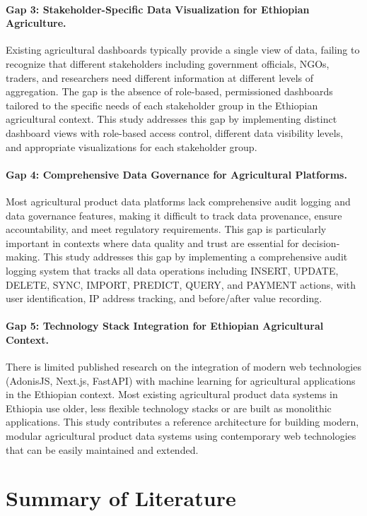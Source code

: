\paragraph{Gap 3: Stakeholder-Specific Data Visualization for Ethiopian Agriculture.}
Existing agricultural dashboards typically provide a single view of data, failing to recognize that different stakeholders including government officials, NGOs, traders, and researchers need different information at different levels of aggregation. The gap is the absence of role-based, permissioned dashboards tailored to the specific needs of each stakeholder group in the Ethiopian agricultural context. This study addresses this gap by implementing distinct dashboard views with role-based access control, different data visibility levels, and appropriate visualizations for each stakeholder group.

\paragraph{Gap 4: Comprehensive Data Governance for Agricultural Platforms.}
Most agricultural product data platforms lack comprehensive audit logging and data governance features, making it difficult to track data provenance, ensure accountability, and meet regulatory requirements. This gap is particularly important in contexts where data quality and trust are essential for decision-making. This study addresses this gap by implementing a comprehensive audit logging system that tracks all data operations including INSERT, UPDATE, DELETE, SYNC, IMPORT, PREDICT, QUERY, and PAYMENT actions, with user identification, IP address tracking, and before/after value recording.

\paragraph{Gap 5: Technology Stack Integration for Ethiopian Agricultural Context.}
There is limited published research on the integration of modern web technologies (AdonisJS, Next.js, FastAPI) with machine learning for agricultural applications in the Ethiopian context. Most existing agricultural product data systems in Ethiopia use older, less flexible technology stacks or are built as monolithic applications. This study contributes a reference architecture for building modern, modular agricultural product data systems using contemporary web technologies that can be easily maintained and extended.

\section{Summary of Literature}

